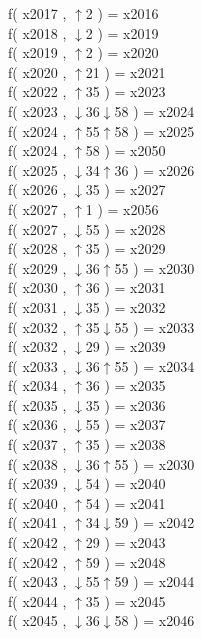 f( x2017 , $\uparrow$2 ) = x2016 \\
f( x2018 , $\downarrow$2 ) = x2019 \\
f( x2019 , $\uparrow$2 ) = x2020 \\
f( x2020 , $\uparrow$21 ) = x2021 \\
f( x2022 , $\uparrow$35 ) = x2023 \\
f( x2023 , $\downarrow$36$\downarrow$58 ) = x2024 \\
f( x2024 , $\uparrow$55$\uparrow$58 ) = x2025 \\
f( x2024 , $\uparrow$58 ) = x2050 \\
f( x2025 , $\downarrow$34$\uparrow$36 ) = x2026 \\
f( x2026 , $\downarrow$35 ) = x2027 \\
f( x2027 , $\uparrow$1 ) = x2056 \\
f( x2027 , $\downarrow$55 ) = x2028 \\
f( x2028 , $\uparrow$35 ) = x2029 \\
f( x2029 , $\downarrow$36$\uparrow$55 ) = x2030 \\
f( x2030 , $\uparrow$36 ) = x2031 \\
f( x2031 , $\downarrow$35 ) = x2032 \\
f( x2032 , $\uparrow$35$\downarrow$55 ) = x2033 \\
f( x2032 , $\downarrow$29 ) = x2039 \\
f( x2033 , $\downarrow$36$\uparrow$55 ) = x2034 \\
f( x2034 , $\uparrow$36 ) = x2035 \\
f( x2035 , $\downarrow$35 ) = x2036 \\
f( x2036 , $\downarrow$55 ) = x2037 \\
f( x2037 , $\uparrow$35 ) = x2038 \\
f( x2038 , $\downarrow$36$\uparrow$55 ) = x2030 \\
f( x2039 , $\downarrow$54 ) = x2040 \\
f( x2040 , $\uparrow$54 ) = x2041 \\
f( x2041 , $\uparrow$34$\downarrow$59 ) = x2042 \\
f( x2042 , $\uparrow$29 ) = x2043 \\
f( x2042 , $\uparrow$59 ) = x2048 \\
f( x2043 , $\downarrow$55$\uparrow$59 ) = x2044 \\
f( x2044 , $\uparrow$35 ) = x2045 \\
f( x2045 , $\downarrow$36$\downarrow$58 ) = x2046 \\
